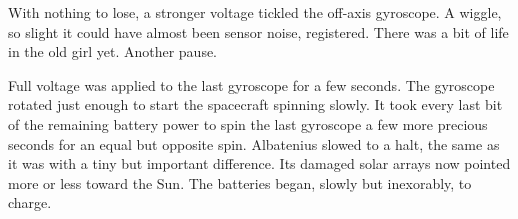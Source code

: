With nothing to lose, a stronger voltage tickled the off-axis gyroscope. A wiggle, so slight it could have almost been sensor noise, registered. There was a bit of life in the old girl yet. Another pause.

Full voltage was applied to the last gyroscope for a few seconds. The gyroscope rotated just enough to start the spacecraft spinning slowly. It took every last bit of the remaining battery power to spin the last gyroscope a few more precious seconds for an equal but opposite spin. Albatenius slowed to a halt, the same as it was with a tiny but important difference. Its damaged solar arrays now pointed more or less toward the Sun. The batteries began, slowly but inexorably, to charge.


\newpage
\thispagestyle{empty}
